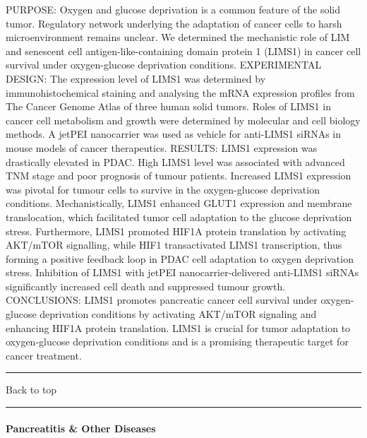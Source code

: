 \documentclass[]{article}
\let\oldparagraph\paragraph
\renewcommand{\paragraph}[1]{\oldparagraph{#1}\mbox{}}
\begin{document}
PURPOSE: Oxygen and glucose deprivation is a common feature of the solid
tumor. Regulatory network underlying the adaptation of cancer cells to
harsh microenvironment remains unclear. We determined the mechanistic
role of LIM and senescent cell antigen-like-containing domain protein 1
(LIMS1) in cancer cell survival under oxygen-glucose deprivation
conditions. EXPERIMENTAL DESIGN: The expression level of LIMS1 was
determined by immunohistochemical staining and analysing the mRNA
expression profiles from The Cancer Genome Atlas of three human solid
tumors. Roles of LIMS1 in cancer cell metabolism and growth were
determined by molecular and cell biology methods. A jetPEI nanocarrier
was used as vehicle for anti-LIMS1 siRNAs in mouse models of cancer
therapeutics. RESULTS: LIMS1 expression was drastically elevated in
PDAC. High LIMS1 level was associated with advanced TNM stage and poor
prognosis of tumour patients. Increased LIMS1 expression was pivotal for
tumour cells to survive in the oxygen-glucose deprivation conditions.
Mechanistically, LIMS1 enhanced GLUT1 expression and membrane
translocation, which facilitated tumor cell adaptation to the glucose
deprivation stress. Furthermore, LIMS1 promoted HIF1A protein
translation by activating AKT/mTOR signalling, while HIF1 transactivated
LIMS1 transcription, thus forming a positive feedback loop in PDAC cell
adaptation to oxygen deprivation stress. Inhibition of LIMS1 with jetPEI
nanocarrier-delivered anti-LIMS1 siRNAs significantly increased cell
death and suppressed tumour growth. CONCLUSIONS: LIMS1 promotes
pancreatic cancer cell survival under oxygen-glucose deprivation
conditions by activating AKT/mTOR signaling and enhancing HIF1A protein
translation. LIMS1 is crucial for tumor adaptation to oxygen-glucose
deprivation conditions and is a promising therapeutic target for cancer
treatment.

{}

{}

\begin{center}\rule{0.5\linewidth}{\linethickness}\end{center}

Back to top

\begin{center}\rule{0.5\linewidth}{\linethickness}\end{center}

\pagebreak

\hypertarget{pancreatitis-other-diseases-1}{%
\paragraph{Pancreatitis \& Other
Diseases}\label{pancreatitis-other-diseases-1}}
\end{document}
